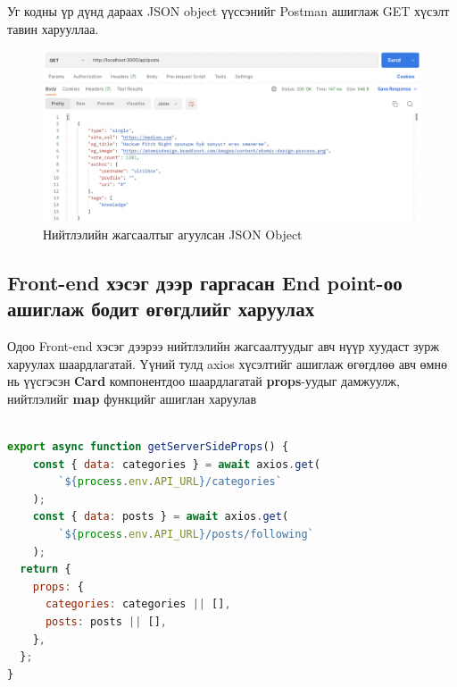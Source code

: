 Уг кодны үр дүнд дараах JSON object үүссэнийг Postman ашиглаж GET хүсэлт тавин харууллаа.

\begin{figure}[h]
	\centering
	\includegraphics[width=13cm]{images/implement/endpoint.png}
	\caption{Нийтлэлийн жагсаалтыг агуулсан JSON Object}
	\label{fig:endpoint}
\end{figure}

\subsection{Front-end хэсэг дээр гаргасан End point-оо ашиглаж бодит өгөгдлийг харуулах}

Одоо Front-end хэсэг дээрээ нийтлэлийн жагсаалтуудыг авч нүүр хуудаст зурж харуулах шаардлагатай. Үүний тулд axios хүсэлтийг ашиглаж өгөгдлөө авч өмнө нь үүсгэсэн \textbf{Card} компонентдоо шаардлагатай \textbf{props}-уудыг дамжуулж, нийтлэлийг \textbf{map} функцийг ашиглан харуулав

\begin{lstlisting}[language=Javascript, caption=ServerSideProps болон axios ашиглан хүсэлт илгээж өгөгдлөө татаж авах, frame=single]
	
export async function getServerSideProps() {
	const { data: categories } = await axios.get(
		`${process.env.API_URL}/categories`
	);
	const { data: posts } = await axios.get(
		`${process.env.API_URL}/posts/following`
	);
  return {
    props: {
      categories: categories || [],
      posts: posts || [],
    },
  };
}

\end{lstlisting}

